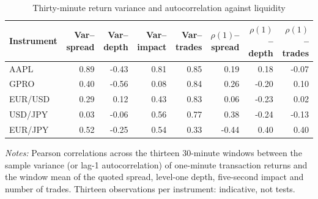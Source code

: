 \begin{table}[htbp]
\centering
\caption{Thirty-minute return variance and autocorrelation against liquidity}
\label{tab:variance_liquidity}
\footnotesize
\begin{tabular}{lrrrrrrr}
\toprule
Instrument & Var--spread & Var--depth & Var--impact & Var--trades & $\rho(1)$--spread & $\rho(1)$--depth & $\rho(1)$--trades \\
\midrule
AAPL & 0.89 & -0.43 & 0.81 & 0.85 & 0.19 & 0.18 & -0.07 \\
GPRO & 0.40 & -0.56 & 0.08 & 0.84 & 0.26 & -0.20 & 0.10 \\
EUR/USD & 0.29 & 0.12 & 0.43 & 0.83 & 0.06 & -0.23 & 0.02 \\
USD/JPY & 0.03 & -0.06 & 0.56 & 0.77 & 0.38 & -0.24 & -0.13 \\
EUR/JPY & 0.52 & -0.25 & 0.54 & 0.33 & -0.44 & 0.40 & 0.40 \\
\bottomrule
\end{tabular}

\begin{minipage}{0.95\linewidth}\footnotesize\emph{Notes:} Pearson correlations across the thirteen 30-minute windows between the sample variance (or lag-1 autocorrelation) of one-minute transaction returns and the window mean of the quoted spread, level-one depth, five-second impact and number of trades. Thirteen observations per instrument: indicative, not tests.\end{minipage}
\end{table}

